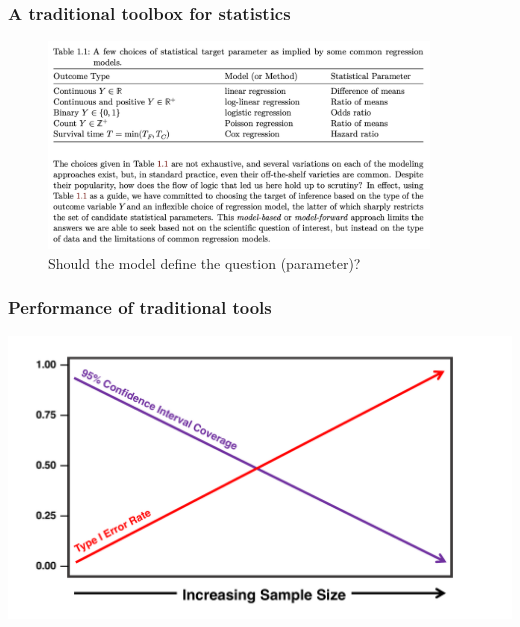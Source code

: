 \documentclass[t]{beamer}
\begin{document}
\begin{frame}
\frametitle{A traditional toolbox for statistics}
\vspace{-12pt}
\centering
\begin{figure}
\includegraphics[width=0.9\textwidth]{figures/parametric.png}
\vspace{0.5em}
Should the model define the question (parameter)?
\end{figure}

\end{frame}
\begin{frame}
\frametitle{Performance of traditional tools}
\vspace{5pt}
\centering
\includegraphics[width=1.05\textwidth]{figures/misspecified.pdf}
\end{frame}
\end{document}
